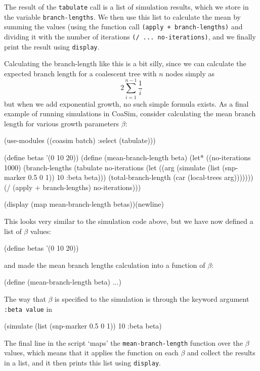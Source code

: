 \documentclass{manual}
\begin{document}
The result of the \texttt{tabulate} call is a list of simulation
results, which we store in the variable \texttt{branch-lengths}.  We
then use this list to calculate the mean by summing the values (using
the function call \texttt{(apply + branch-lengths)} and dividing it
with the number of iterations \texttt{(/ ... no-iterations)}, and we
finally print the result using \texttt{display}.


Calculating the branch-length like this is a bit silly, since we can
calculate the expected branch length for a coalescent tree with $n$
nodes simply as
\[
  2\sum_{i=1}^{n-1}\frac{1}{i}
\]
but when we add exponential growth, no such simple formula exists.  As
a final example of running simulations in CoaSim, consider calculating
the mean branch length for various growth parameters $\beta$:

\begin{code}
(use-modules ((coasim batch) :select (tabulate)))

(define betas '(0 10 20))
(define (mean-branch-length beta)
  (let* ((no-iterations 1000)
         (branch-lengths
          (tabulate no-iterations
            (let ((arg (simulate (list (snp-marker 0.5 0 1)) 10 :beta beta)))
              (total-branch-length (car (local-trees arg)))))))
    (/ (apply + branch-lengths) no-iterations)))

(display (map mean-branch-length betas))(newline)
\end{code}

This looks very similar to the simulation code above, but we have now
defined a list of $\beta$ values:
\begin{code}
(define betas '(0 10 20))
\end{code}
and made the mean branch lengths calculation into a function of $\beta$:
\begin{code}
(define (mean-branch-length beta)
    ...)
\end{code}

The way that $\beta$ is specified to the simulation is through the
keyword argument \texttt{:beta value} in
\begin{code}
    (simulate (list (snp-marker 0.5 0 1)) 10 :beta beta)
\end{code}

The final line in the script `maps' the \texttt{mean-branch-length}
function over the $\beta$ values, which means that it applies the
function on each $\beta$ and collect the results in a list, and it
then prints this list using \texttt{display}.
\end{document}
